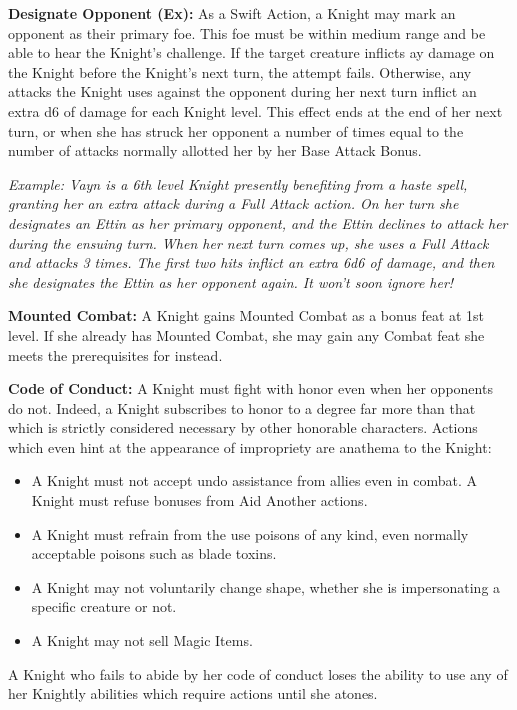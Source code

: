 \documentclass[10pt]{article}
\newcommand{\ability}[2]{\smallskip \noindent \textbf{#1} #2}
\newcommand{\example}[1]{\emph{#1}}
\newcommand{\itemspace}[0]{\setlength{\itemsep}{-1mm}}
\begin{document}
\ability{Designate Opponent (Ex):}{As a Swift Action, a Knight may mark an opponent as their primary foe. This foe must be within medium range and be able to hear the Knight's challenge. If the target creature inflicts ay damage on the Knight before the Knight's next turn, the attempt fails. Otherwise, any attacks the Knight uses against the opponent during her next turn inflict an extra d6 of damage for each Knight level. This effect ends at the end of her next turn, or when she has struck her opponent a number of times equal to the number of attacks normally allotted her by her Base Attack Bonus. \smallskip

\example{Example: Vayn is a 6th level Knight presently benefiting from a haste spell, granting her an extra attack during a Full Attack action. On her turn she designates an Ettin as her primary opponent, and the Ettin declines to attack her during the ensuing turn. When her next turn comes up, she uses a Full Attack and attacks 3 times. The first two hits inflict an extra 6d6 of damage, and then she designates the Ettin as her opponent again. It won't soon ignore her!}}

\ability{Mounted Combat:}{A Knight gains Mounted Combat as a bonus feat at 1st level. If she already has Mounted Combat, she may gain any Combat feat she meets the prerequisites for instead.}

\ability{Code of Conduct:}{A Knight must fight with honor even when her opponents do not. Indeed, a Knight subscribes to honor to a degree far more than that which is strictly considered necessary by other honorable characters. Actions which even hint at the appearance of impropriety are anathema to the Knight:

\begin{itemize} \itemspace
    \item A Knight must not accept undo assistance from allies even in combat. A Knight must refuse bonuses from Aid Another actions.
    \item A Knight must refrain from the use poisons of any kind, even normally acceptable poisons such as blade toxins.
    \item A Knight may not voluntarily change shape, whether she is impersonating a specific creature or not.
    \item A Knight may not sell Magic Items.
\end{itemize}

A Knight who fails to abide by her code of conduct loses the ability to use any of her Knightly abilities which require actions until she atones.}
\end{document}
